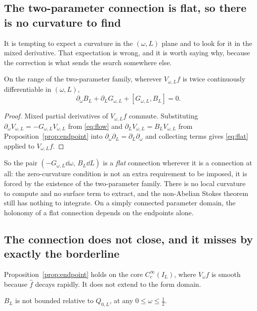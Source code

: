 \subsection{The two-parameter connection is flat, so there is no curvature to find}

It is tempting to expect a curvature in the $(\omega,L)$ plane and to look for it
in the mixed derivative. That expectation is wrong, and it is worth saying why,
because the correction is what sends the search somewhere else.

\begin{proposition}[Flatness]\label{prop:flat}
On the range of the two-parameter family, wherever $V_{\omega,L}f$ is twice
continuously differentiable in $(\omega,L)$,
\begin{equation}\label{eq:flat}
 \partial_\omega B_L+\partial_LG_{\omega,L}+[G_{\omega,L},B_L]=0 .
\end{equation}
\end{proposition}

\begin{proof}
Mixed partial derivatives of $V_{\omega,L}f$ commute. Substituting
$\partial_\omega V_{\omega,L}=-G_{\omega,L}V_{\omega,L}$ from \eqref{eq:flow} and
$\partial_LV_{\omega,L}=B_LV_{\omega,L}$ from Proposition~\ref{prop:endpoint}
into $\partial_\omega\partial_L=\partial_L\partial_\omega$ and collecting terms
gives \eqref{eq:flat} applied to $V_{\omega,L}f$.
\end{proof}

So the pair $(-G_{\omega,L}\dd\omega,\,B_L\dd L)$ is a \emph{flat} connection
wherever it is a connection at all: the zero-curvature condition is not an extra
requirement to be imposed, it is forced by the existence of the two-parameter
family. There is no local curvature to compute and no surface term to extract,
and the non-Abelian Stokes theorem still has nothing to integrate. On a simply
connected parameter domain, the holonomy of a flat connection depends on the
endpoints alone.

\subsection{The connection does not close, and it misses by exactly the borderline}

Proposition~\ref{prop:endpoint} holds on the core $C_c^\infty(I_L)$, where
$V_\omega f$ is smooth because $\widehat f$ decays rapidly. It does not extend to
the form domain.

\begin{proposition}\label{prop:trace}
$B_L$ is not bounded relative to $Q_{0,L}$, at any $0\leq\omega\leq\frac12$.
\end{proposition}

